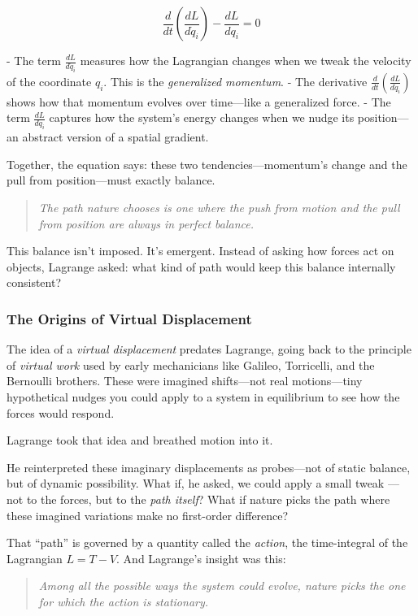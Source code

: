 \[
\frac{d}{dt} \left( \frac{dL}{d\dot{q}_i} \right) - \frac{dL}{dq_i} = 0
\]

- The term \( \frac{dL}{d\dot{q}_i} \) measures how the Lagrangian changes when we tweak the velocity of the coordinate \( q_i \). This is the \textit{generalized momentum}.
- The derivative \( \frac{d}{dt} \left( \frac{dL}{d\dot{q}_i} \right) \) shows how that momentum evolves over time—like a generalized force.
- The term \( \frac{dL}{dq_i} \) captures how the system’s energy changes when we nudge its position—an abstract version of a spatial gradient.

Together, the equation says: these two tendencies—momentum’s change and the pull from position—must exactly balance.

\begin{quote}
    \textit{The path nature chooses is one where the push from motion and the pull from position are always in perfect balance.}
\end{quote}

This balance isn’t imposed. It’s emergent. Instead of asking how forces act on objects, Lagrange asked: what kind of path would keep this balance internally consistent?

\subsubsection{The Origins of Virtual Displacement}

The idea of a \textit{virtual displacement} predates Lagrange, going back to the principle of \textit{virtual work} used by early mechanicians like Galileo, Torricelli, and the Bernoulli brothers. These were imagined shifts—not real motions—tiny hypothetical nudges you could apply to a system in equilibrium to see how the forces would respond.

Lagrange took that idea and breathed motion into it.

He reinterpreted these imaginary displacements as probes—not of static balance, but of dynamic possibility. What if, he asked, we could apply a small tweak — not to the forces, but to the \textit{path itself}? What if nature picks the path where these imagined variations make no first-order difference?

That “path” is governed by a quantity called the \textit{action}, the time-integral of the Lagrangian \( L = T - V \). And Lagrange’s insight was this:

\begin{quote}
\textit{Among all the possible ways the system could evolve, nature picks the one for which the action is stationary.}
\end{quote}

